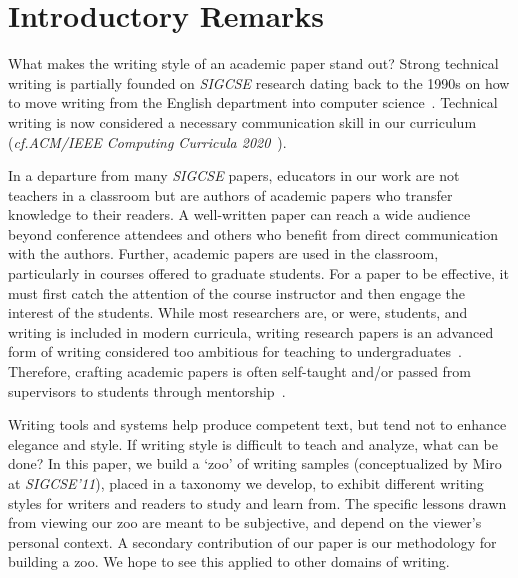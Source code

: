 \documentclass[sigconf]{acmart}
\newcommand{\cf}{\textit{cf.}\xspace}
\begin{document}


\maketitle

\section{Introductory Remarks}

What makes the writing style of an academic paper stand out? Strong technical writing is partially founded on \textit{SIGCSE} research dating back to the 1990s on how to move writing from the English department into computer science~\cite{Pes91,TP93,FPC96,Kay98}. Technical writing is now considered a necessary communication skill in our curriculum (\cf \textit{ACM/IEEE Computing Curricula 2020}~\cite{CC2020,CC2020report}).

In a departure from many \textit{SIGCSE} papers, educators in our work are not teachers in a classroom but are authors of academic papers who transfer knowledge to their readers. A well-written paper can reach a wide audience beyond conference attendees and others who benefit from direct communication with the authors. Further, academic papers are used in the classroom, particularly in courses offered to graduate students. For a paper to be effective, it must first catch the attention of the course instructor and then engage the interest of the students. While most researchers are, or were, students, and writing is included in modern curricula, writing research papers is an advanced form of writing considered too ambitious for teaching to undergraduates~\cite{Gar10}. Therefore, crafting academic papers is often self-taught and/or passed from supervisors to students through mentorship~\cite{Mir11}.

Writing tools and systems help produce competent text, but tend not to enhance elegance and style. If writing style is difficult to teach and analyze, what can be done? In this paper, we build a `zoo' of writing samples (conceptualized by Miro~\cite{Mir11} at \textit{SIGCSE'11}), placed in a taxonomy we develop, to exhibit different writing styles for writers and readers to study and learn from. The specific lessons drawn from viewing our zoo are meant to be subjective, and depend on the viewer's personal context. A secondary contribution of our paper is our methodology for building a zoo. We hope to see this applied to other domains of writing.
\end{document}
